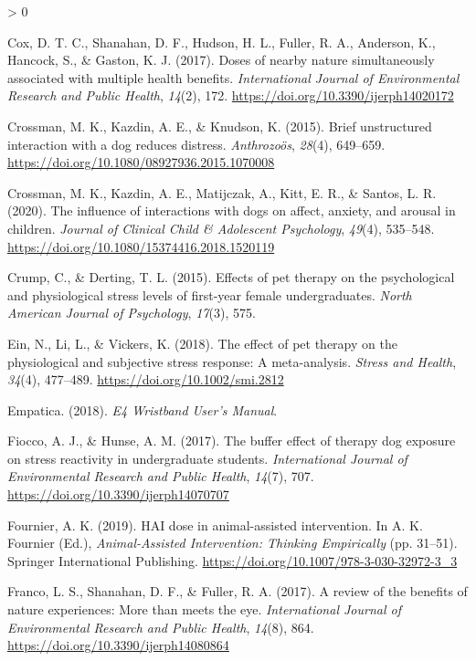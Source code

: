 \documentclass[
  english,
  pub,floatsintext]{apa6}
\newlength{\cslhangindent}
\newenvironment{CSLReferences}[2] %
 {%
  \setlength{\parindent}{0pt}
  \ifodd #1 \everypar{\setlength{\hangindent}{\cslhangindent}}\ignorespaces\fi
  \ifnum #2 > 0
  \setlength{\parskip}{#2\baselineskip}
  \fi
 }%
 {}
\begin{document}
\begin{CSLReferences}{1}{0}
\leavevmode\hypertarget{ref-Cox.etal.2017}{}%
Cox, D. T. C., Shanahan, D. F., Hudson, H. L., Fuller, R. A., Anderson, K., Hancock, S., \& Gaston, K. J. (2017). Doses of nearby nature simultaneously associated with multiple health benefits. \emph{International Journal of Environmental Research and Public Health}, \emph{14}(2), 172. \url{https://doi.org/10.3390/ijerph14020172}

\leavevmode\hypertarget{ref-Crossman.etal.2015}{}%
Crossman, M. K., Kazdin, A. E., \& Knudson, K. (2015). Brief unstructured interaction with a dog reduces distress. \emph{Anthrozoös}, \emph{28}(4), 649--659. \url{https://doi.org/10.1080/08927936.2015.1070008}

\leavevmode\hypertarget{ref-Crossman.etal.2020}{}%
Crossman, M. K., Kazdin, A. E., Matijczak, A., Kitt, E. R., \& Santos, L. R. (2020). The influence of interactions with dogs on affect, anxiety, and arousal in children. \emph{Journal of Clinical Child \& Adolescent Psychology}, \emph{49}(4), 535--548. \url{https://doi.org/10.1080/15374416.2018.1520119}

\leavevmode\hypertarget{ref-Crump.Derting.2015}{}%
Crump, C., \& Derting, T. L. (2015). Effects of pet therapy on the psychological and physiological stress levels of first-year female undergraduates. \emph{North American Journal of Psychology}, \emph{17}(3), 575.

\leavevmode\hypertarget{ref-Ein.etal.2018}{}%
Ein, N., Li, L., \& Vickers, K. (2018). The effect of pet therapy on the physiological and subjective stress response: {A} meta-analysis. \emph{Stress and Health}, \emph{34}(4), 477--489. \url{https://doi.org/10.1002/smi.2812}

\leavevmode\hypertarget{ref-Empatica.2018}{}%
Empatica. (2018). \emph{E4 {Wristband User}'s {Manual}}.

\leavevmode\hypertarget{ref-Fiocco.Hunse.2017}{}%
Fiocco, A. J., \& Hunse, A. M. (2017). The buffer effect of therapy dog exposure on stress reactivity in undergraduate students. \emph{International Journal of Environmental Research and Public Health}, \emph{14}(7), 707. \url{https://doi.org/10.3390/ijerph14070707}

\leavevmode\hypertarget{ref-Fournier.2019}{}%
Fournier, A. K. (2019). {HAI} dose in animal-assisted intervention. In A. K. Fournier (Ed.), \emph{Animal-{Assisted Intervention}: {Thinking Empirically}} (pp. 31--51). {Springer International Publishing}. \url{https://doi.org/10.1007/978-3-030-32972-3_3}

\leavevmode\hypertarget{ref-Franco.etal.2017}{}%
Franco, L. S., Shanahan, D. F., \& Fuller, R. A. (2017). A review of the benefits of nature experiences: {More} than meets the eye. \emph{International Journal of Environmental Research and Public Health}, \emph{14}(8), 864. \url{https://doi.org/10.3390/ijerph14080864}


\end{CSLReferences}
\end{document}
